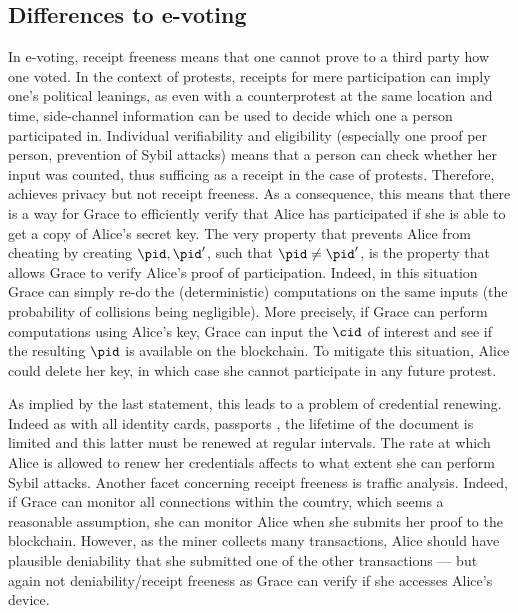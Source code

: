  
\subsection{Differences to e-voting}

In e-voting, receipt freeness means that one cannot prove to a third party how one voted. 
In the context of protests, receipts for mere participation can imply one's political leanings, as even with a counterprotest at the same location and time, side-channel information can be used to decide which one a person participated in. 
Individual verifiability and eligibility (especially one proof per person, prevention of Sybil attacks) means that a person can check whether her input was counted, thus sufficing as a receipt in the case of protests.  
Therefore, \PRIVO achieves privacy but not receipt freeness.
As a consequence, this means that there is a way for Grace to efficiently verify that Alice has participated if she is able to get a copy of Alice's secret key. 
The very property that prevents Alice from cheating by creating \(\pid, \pid'\), such that \(\pid \neq \pid'\), is the property that
allows Grace to verify Alice's proof of participation.  
Indeed, in this situation Grace can simply re-do the (deterministic) computations on the same inputs (the probability of collisions being negligible).  
More precisely, if Grace can perform computations using Alice's key, Grace can input the \(\cid\) of interest and see if the resulting \(\pid\) is available on the blockchain.  
To mitigate this situation, Alice could delete her key, in which case she cannot participate in any future protest.  

As implied by the last statement, this leads to a problem of credential renewing.  
Indeed as with all identity cards, passports \etc, the lifetime of the document is limited and this latter must be renewed at regular intervals.  
The rate at which Alice is allowed to renew her credentials affects to what extent she can perform Sybil attacks. 
Another facet concerning receipt freeness is traffic analysis. 
Indeed, if Grace can monitor all connections within the country, which seems a reasonable assumption, she can monitor Alice when she submits her proof to the blockchain. 
However, as the miner collects many transactions, Alice should have plausible deniability that she submitted one of the other transactions --- but again not deniability/receipt freeness as Grace can verify if she accesses Alice's device.

